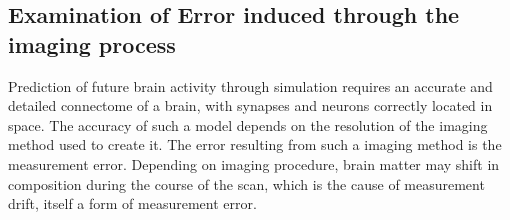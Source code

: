 \subsection[Error induced through noise]{Examination of Error induced through the imaging process}

Prediction of future brain activity through simulation requires an accurate and
detailed connectome of a brain, with synapses and neurons correctly located in
space.\autocite{bostrom_whole_2008} The accuracy of such a model depends on the
resolution of the imaging method used to create it. The error resulting from
such a imaging method is the measurement error. Depending on imaging procedure, brain matter may shift in composition during the course of the scan, which is the cause of measurement drift, itself a form of measurement error.



